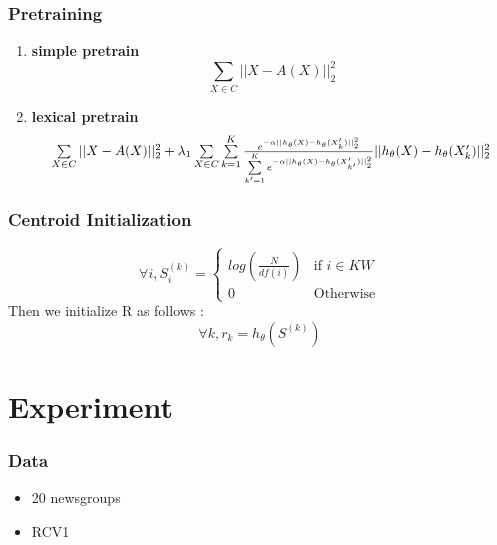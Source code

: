 \documentclass{beamer}
\begin{document}
\begin{frame}
  \frametitle{Pretraining}
  \begin{enumerate} 
  \item \textbf{simple pretrain} 
    $$\sum\limits_{X \in C} || X - A(X)||_2^2$$
  \item \textbf{lexical pretrain}
    $$
    \resizebox{0.91\hsize}{!}{$\sum\limits_{X \in C} || X - A(X)||_2^2 + 
      \lambda_1 \sum\limits_{X \in C} \sum\limits_{k = 1}^K \frac{e^{-\alpha|| h_\theta(X) - 
          h_\theta(X'_k)||_2^2}}{\sum\limits_{k' = 1}^K e^{-\alpha|| h_\theta(X) - 
          h_\theta(X'_{k'})||_2^2}}|| h_\theta(X) - h_\theta(X'_{k})||_2^2$}$$
  \end{enumerate}
\end{frame}

\begin{frame}
  \frametitle{Centroid Initialization}
  \begin{equation*}
    \forall i, S^{(k)}_i = \left\{
    \begin{array}{ll}
      log\left(\frac{N}{df(i)}\right) & \mbox{if } i \in KW \\
      0 & \mbox{Otherwise}
    \end{array}
    \right.
  \end{equation*}
  Then we initialize R as follows :
  \begin{equation*}
    \forall k, r_k =  h_\theta(S^{(k)})
  \end{equation*}
\end{frame}
\section{Experiment}

\begin{frame}
  \frametitle{Data}
  \begin{itemize}
    \setlength\itemsep{2em}
  \item 20 newsgroups
  \item RCV1 
  \end{itemize}
\end{frame}
\end{document}
